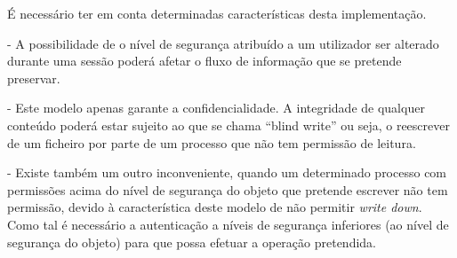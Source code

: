 \documentclass[../tp2.tex]{subfiles}
\begin{document}
É necessário ter em conta determinadas características desta implementação.\par 
- A possibilidade de o nível de segurança atribuído a um utilizador ser alterado durante uma sessão poderá afetar o fluxo de informação que se pretende preservar.\par 
- Este modelo apenas garante a confidencialidade. A integridade de qualquer conteúdo poderá estar sujeito ao que se chama ``blind write'' ou seja, o reescrever de um ficheiro por parte de um processo que não tem permissão de leitura.\par 
- Existe também um outro inconveniente, quando um determinado processo com permissões acima do nível de segurança do objeto que pretende escrever não tem permissão, devido à característica deste modelo de não permitir \textit{write down}. Como tal é necessário a autenticação a níveis de segurança inferiores (ao nível de segurança do objeto) para que possa efetuar a operação pretendida.
\end{document}
